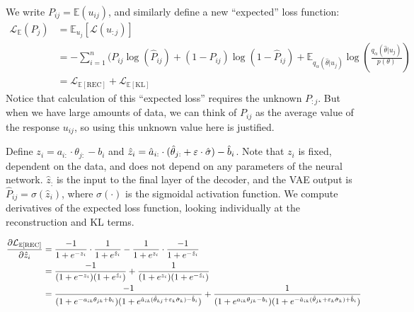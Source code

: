\documentclass[letterpaper]{article}
\def \e{\ensuremath \varepsilon}
\theoremstyle{definition}
\begin{document}
We write $P_{ij} = \mathbb{E}(u_{ij})$, and similarly define a new ``expected'' loss function:
\begin{equation}
  \begin{split}
  \mathcal{L}_\mathbb{E}(P_j) &= \mathbb{E}_{u_j}[\mathcal{L}(u_{:j})] \\
  &= -\sum_{i=1}^n (P_{ij} \log(\hat P_{ij}) + (1-P_{ij})\log(1 - \hat P_{ij}) + \mathbb{E}_{q_\alpha(\hat \theta | u_j)}\log\left( \frac{q_{\alpha}(\hat \theta |u_j)}{p(\theta)}\right) \\
    &= \mathcal{L}_{\mathbb{E}[\text{REC}]} + \mathcal{L}_{\mathbb{E}[\text{KL}]}
  \end{split}
  \label{eq:expected_loss}
\end{equation}
Notice that calculation of this ``expected loss'' requires the unknown $P_{:j}$. But when we have large amounts of data, we can think of $P_{ij}$ as the average value of the response $u_{ij}$, so using this unknown value here is justified.

Define $z_i = a_{i:} \cdot \theta_{j:} - b_i$ and $\hat z_i = \hat a_{i:} \cdot (\hat \theta_{j:} + \e \cdot \hat \sigma) - \hat b_i$. Note that $z_i$ is fixed, dependent on the data, and does not depend on any parameters of the neural network. $\hat z_:$ is the input to the final layer of the decoder, and the VAE output is $\hat P_{ij} = \sigma(\hat z_i)$, where $\sigma(\cdot)$ is the sigmoidal activation function. We compute derivatives of the expected loss function, looking individually at the reconstruction and KL terms. 

\begin{equation}
  \begin{split}
  \frac{\partial \mathcal{L}_{\mathbb{E}[\text{REC}]}}{\partial \hat z_i} &= \frac{-1}{1 + e^{-z_i}}\cdot \frac{1}{1 + e^{\hat z_i}} - \frac{1}{1 + e^{z_i}}\cdot \frac{-1}{1 + e^{-\hat z_i}} \\
  &= \frac{-1}{(1 + e^{-z_i})(1 + e^{\hat z_i})} + \frac{1}{(1 + e^{z_i})(1 + e^{-\hat z_i})} \\
  &= \frac{-1}{(1 + e^{-a_{ik}\theta_{jk} + b_i})(1 + e^{\hat a_{ik} (\hat \theta_{kj} + \e_k \hat \sigma_k) - \hat b_i})} + \frac{1}{(1 + e^{a_{ik}\theta_{jk} - b_i})(1 + e^{-\hat a_{ik}(\hat \theta_{jk} + \e_k \hat \sigma_k) + \hat b_i})} 
\end{split}
  \label{eq:z_deriv}
\end{equation}
\end{document}
